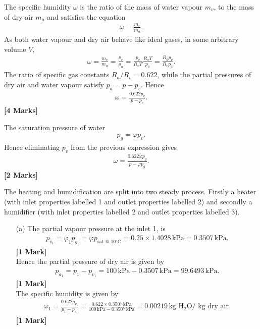\documentclass[12pt,twoside]{report}
\renewcommand\phi{\varphi}
\begin{document}
\begin{description}
The specific humidity $\omega$ is the ratio of the mass of water vapour $m_v$, to the mass of dry air $m_a$ and satisfies the equation
\begin{align*}
 \omega = \frac{m_v}{m_a}.
\end{align*}
As both water vapour and dry air behave like ideal gases, in some arbitrary volume $V$,
\begin{align*}
 \omega = \frac{m_v}{m_a} = \frac{\rho_v}{\rho_a} = \frac{p_v}{R_v T} \frac{R_a T}{p_a} = \frac{R_a p_v}{R_v p_a}.
\end{align*}
The ratio of specific gas constants $R_a/R_v = 0.622$, while the partial pressures of dry air and water vapour satisfy $p_a = p - p_v$. Hence
\begin{align*}
 \omega = \frac{0.622 p_v}{p - p_v}.
\end{align*} \hfill \textbf{[4 Marks]}

The saturation pressure of water
\begin{align*} 
 p_g = \phi p_v.
\end{align*}
Hence eliminating $p_v$ from the previous expression gives
\begin{align*}
 \omega = \frac{0.622 \phi p_g}{p - \phi p_g}.
\end{align*} \hfill \textbf{[2 Marks]}


The heating and humidification are split into two steady process. Firstly a heater (with inlet properties labelled 1 and outlet properties labelled 2) and secondly a humidifier (with inlet properties labelled 2 and outlet properties labelled 3).

\begin{itemize}
\item[(a)] The partial vapour pressure at the inlet 1, is
\begin{align*}
 p_{v_1} = \phi_1 p_{g_1} = \phi p_\text{sat @ 10$^\circ$C} = 0.25 \times 1.4028\,\mbox{kPa} = 0.3507\,\mbox{kPa}.
\end{align*} \hfill \textbf{[1 Mark]} \\
Hence the partial pressure of dry air is given by
\begin{align*}
 p_{a_1} = p_1 - p_{v_1} = 100\,\mbox{kPa} - 0.3507\,\mbox{kPa} = 99.6493\,\mbox{kPa}.
\end{align*} \hfill \textbf{[1 Mark]} \\
The specific humidity is given by
\begin{align*}
 \omega_1 = \frac{0.622 p_{v_1}}{p_1 - p_{v_1}} = \frac{0.622 \times 0.3507\,\mbox{kPa}}{100\,\mbox{kPa} - 0.3507\,\mbox{kPa}} = 0.00219\,\mbox{kg H$_2$O/ kg dry air}.
\end{align*} \hfill \textbf{[1 Mark]} \\


\end{itemize}
\end{description}
\end{document}

